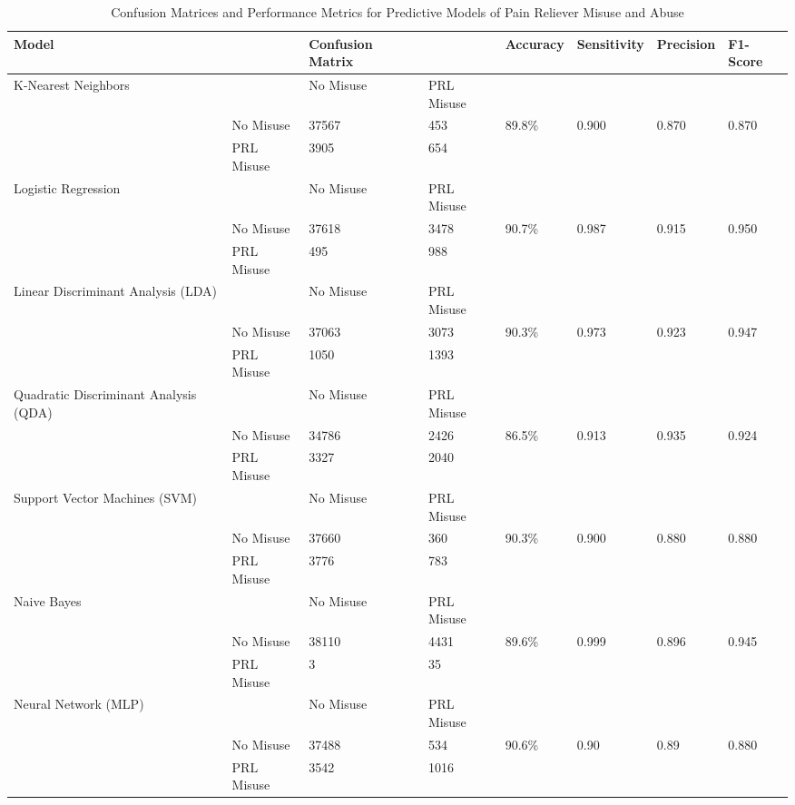 \documentclass[sigconf]{acmart}
\begin{document}
\begin{table*}[ht]
  \caption{Confusion Matrices and Performance Metrics for Predictive Models of 
  Pain Reliever Misuse and Abuse}
  \label{tab:freq}
  \begin{tabular}{llllllll}
    \toprule
    Model& & Confusion Matrix & & Accuracy & Sensitivity & Precision & F1-Score \\
    \midrule
    K-Nearest Neighbors & & No Misuse & PRL Misuse &  &  &  & \\
     & No Misuse & 37567 & 453 & 89.8\% & 0.900 & 0.870 & 0.870 \\
     & PRL Misuse & 3905 & 654 &  &  &  & \\
    \midrule
    Logistic Regression & & No Misuse & PRL Misuse &  &  &  & \\
     & No Misuse & 37618 & 3478 & 90.7\% & 0.987 & 0.915 & 0.950 \\
     & PRL Misuse &  495 &  988 &  &  &  & \\
    \midrule
    Linear Discriminant Analysis (LDA) & & No Misuse & PRL Misuse &  &  &  & \\
     & No Misuse & 37063 & 3073 & 90.3\% & 0.973 & 0.923 & 0.947 \\
     & PRL Misuse & 1050 & 1393 &  &  &  & \\
    \midrule
    Quadratic Discriminant Analysis (QDA) & & No Misuse & PRL Misuse &  &  &  & \\
     & No Misuse & 34786 & 2426 & 86.5\% & 0.913 & 0.935 & 0.924 \\
     & PRL Misuse & 3327 & 2040 &  &  &  & \\
    \midrule
    Support Vector Machines (SVM) & & No Misuse & PRL Misuse &  &  &  & \\
     & No Misuse & 37660 & 360 & 90.3\% & 0.900 & 0.880 & 0.880 \\
     & PRL Misuse & 3776 & 783 &  &  &  & \\
    \midrule
    Naive Bayes & & No Misuse & PRL Misuse &  &  &  & \\
     & No Misuse & 38110 & 4431 & 89.6\% & 0.999 & 0.896 & 0.945 \\
     & PRL Misuse & 3 & 35 &  &  &  & \\
    \midrule
    Neural Network (MLP) & & No Misuse & PRL Misuse &  &  &  & \\
     & No Misuse & 37488 & 534 & 90.6\% & 0.90 & 0.89 & 0.880 \\
     & PRL Misuse & 3542 & 1016 &  &  &  & \\

\end{tabular}
\end{table*}
\end{document}
